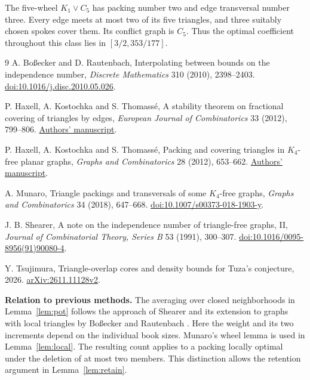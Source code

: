 \documentclass[11pt,a4paper]{article}
\newcommand{\smalltitle}[1]{\par\medskip\noindent\textbf{#1}\enspace}
\begin{document}
The five-wheel \(K_1\vee C_5\) has packing number two and edge transversal
number three. Every edge meets at most two of its five triangles, and three
suitably chosen spokes cover them. Its conflict graph is \(C_5\).
Thus the optimal coefficient throughout this class lies in
\([3/2,353/177]\).

\newpage
\renewcommand{\refname}{Sources and verification}
\begin{thebibliography}{9}
 A. Bo\ss ecker and D. Rautenbach,
Interpolating between bounds on the independence number,
\emph{Discrete Mathematics} 310 (2010), 2398--2403.
\href{https://doi.org/10.1016/j.disc.2010.05.026}{doi:10.1016/j.disc.2010.05.026}.

 P. Haxell, A. Kostochka and S. Thomassé,
A stability theorem on fractional covering of triangles by edges,
\emph{European Journal of Combinatorics} 33 (2012), 799--806.
\href{https://perso.ens-lyon.fr/stephan.thomasse/liste/fractuza.pdf}{Authors' manuscript}.

 P. Haxell, A. Kostochka and S. Thomassé,
Packing and covering triangles in \(K_4\)-free planar graphs,
\emph{Graphs and Combinatorics} 28 (2012), 653--662.
\href{https://perso.ens-lyon.fr/stephan.thomasse/liste/packplanar.pdf}{Authors' manuscript}.

 A. Munaro, Triangle packings and transversals of some
\(K_4\)-free graphs, \emph{Graphs and Combinatorics} 34 (2018), 647--668.
\href{https://doi.org/10.1007/s00373-018-1903-y}{doi:10.1007/s00373-018-1903-y}.

 J. B. Shearer, A note on the independence number of
triangle-free graphs, II, \emph{Journal of Combinatorial Theory, Series B}
53 (1991), 300--307.
\href{https://doi.org/10.1016/0095-8956(91)90080-4}{doi:10.1016/0095-8956(91)90080-4}.

 Y. Tsujimura, Triangle-overlap cores and density bounds for
Tuza's conjecture, 2026.
\href{https://arxiv.org/html/2611.11128v2}{arXiv:2611.11128v2}.
\end{thebibliography}

\smalltitle{Relation to previous methods.}
The averaging over closed neighborhoods in Lemma~\ref{lem:pot} follows
the approach of Shearer \cite{shearer} and its extension to graphs with local triangles
by Bo\ss ecker and Rautenbach \cite{br}. Here the weight and its two
increments depend on the individual book sizes. Munaro's wheel lemma is
used in Lemma~\ref{lem:local}. The resulting count applies to a packing
locally optimal under the deletion of at most two members. This distinction
allows the retention argument in Lemma~\ref{lem:retain}.
\end{document}
